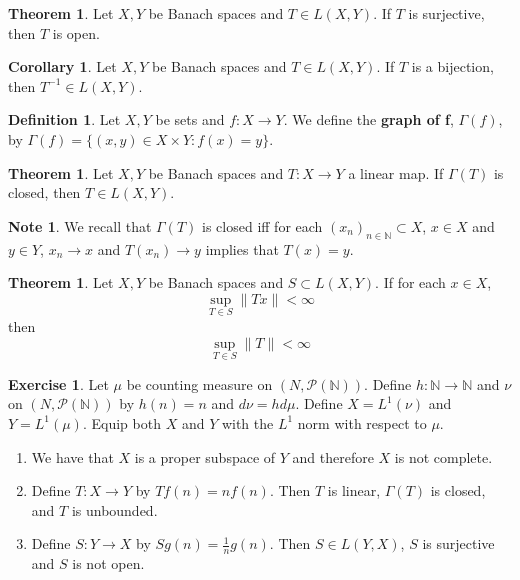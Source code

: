 \documentclass[12pt]{amsart}
\theoremstyle{definition}
\newtheorem{defn}[definition]{Definition}
\newtheorem{note}[definition]{Note}
\newtheorem{thm}[definition]{Theorem}
\newtheorem{cor}[definition]{Corollary}
\newtheorem{ex}[definition]{Exercise}
\newcommand{\Gam}{\Gamma}
\newcommand{\N}{\mathbb{N}}
\newcommand{\MP}{\mathcal{P}}
\newcommand{\conv}[1]{\xrightarrow{#1}}
\newcommand{\lex}[1]{\label{ex:#1}}
\newcommand{\ld}[1]{\label{defn:#1}}
\begin{document}
	\begin{thm}
		Let $X, Y$ be Banach spaces and $T\in L(X,Y)$. If $T$ is surjective, then $T$ is open.
	\end{thm}
	
	\begin{cor}
		Let $X, Y$ be Banach spaces and $T \in L(X,Y)$. If $T$ is a bijection, then $T^{-1} \in L(X,Y)$.
	\end{cor}
	
	\begin{defn} \ld{}
		Let $X,Y$ be sets and $f:X \rightarrow Y$. We define the \textbf{graph of f}, $\Gam(f)$, by $\Gam(f) = \{(x,y) \in X \times Y: f(x) = y\}$.
	\end{defn}
	
	\begin{thm}
		Let $X, Y$ be Banach spaces and $T:X \rightarrow Y$ a linear map. If $\Gam(T)$ is closed, then $T \in L(X,Y)$.  
	\end{thm}
	
	\begin{note}
		We recall that $\Gam(T)$ is closed iff for each $(x_n)_{n \in \N} \subset X$, $x \in X$ and $y \in Y$, $x_n \conv{} x$ and $T(x_n) \conv{} y$ implies that $T(x) = y$. 
	\end{note}
	
	\begin{thm}
		
		Let $X, Y$ be Banach spaces and $S \subset L(X,Y)$. If for each $x \in X$, $$\sup_{T \in S} \|Tx \|< \infty$$ then $$\sup_{T \in S} \|T \|< \infty$$
	\end{thm}
	
	\begin{ex} \lex{}
		Let $\mu$ be counting measure on $(N, \MP(\N))$. Define $h: \N \rightarrow \N$ and $ \nu$ on $(N, \MP(\N))$ by $h(n) = n$ and $d \nu = h d \mu$. Define $X=L^1(\nu)$ and $Y = L^1(\mu)$. Equip both $X$ and $Y$ with the $L^1$ norm with respect to $\mu$. 
		\begin{enumerate}
			\item We have that $X$ is a proper subspace of $Y$ and therefore $X$ is not complete.
			\item Define $T: X \rightarrow Y$ by $Tf(n) = nf(n)$. Then $T$ is linear, $\Gam(T)$ is closed, and $T$ is unbounded.
			\item Define $S:Y \rightarrow X$ by $Sg(n) = \frac{1}{n}g(n)$. Then $S \in L(Y,X)$, $S$ is surjective and $S$ is not open. 
		\end{enumerate}
	\end{ex}
	
\end{document}
